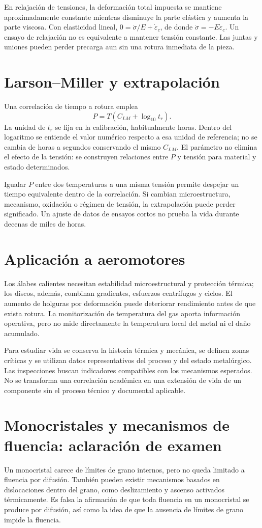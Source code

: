 En relajación de tensiones, la deformación total impuesta se mantiene aproximadamente constante mientras disminuye la parte elástica y aumenta la parte viscosa. Con elasticidad lineal, $0=\dot\sigma/E+\dot\varepsilon_c$, de donde $\dot\sigma=-E\dot\varepsilon_c$. Un ensayo de relajación no es equivalente a mantener tensión constante. Las juntas y uniones pueden perder precarga aun sin una rotura inmediata de la pieza.
\section{Larson--Miller y extrapolación}
Una correlación de tiempo a rotura emplea
\begin{equation}P=T\left(C_{LM}+\log_{10}t_r\right).\label{eq:larson}\end{equation}
La unidad de $t_r$ se fija en la calibración, habitualmente horas. Dentro del logaritmo se entiende el valor numérico respecto a esa unidad de referencia; no se cambia de horas a segundos conservando el mismo $C_{LM}$. El parámetro no elimina el efecto de la tensión: se construyen relaciones entre $P$ y tensión para material y estado determinados.

Igualar $P$ entre dos temperaturas a una misma tensión permite despejar un tiempo equivalente dentro de la correlación. Si cambian microestructura, mecanismo, oxidación o régimen de tensión, la extrapolación puede perder significado. Un ajuste de datos de ensayos cortos no prueba la vida durante decenas de miles de horas.
\section{Aplicación a aeromotores}
Los álabes calientes necesitan estabilidad microestructural y protección térmica; los discos, además, combinan gradientes, esfuerzos centrífugos y ciclos. El aumento de holguras por deformación puede deteriorar rendimiento antes de que exista rotura. La monitorización de temperatura del gas aporta información operativa, pero no mide directamente la temperatura local del metal ni el daño acumulado.

Para estudiar vida se conserva la historia térmica y mecánica, se definen zonas críticas y se utilizan datos representativos del proceso y del estado metalúrgico. Las inspecciones buscan indicadores compatibles con los mecanismos esperados. No se transforma una correlación académica en una extensión de vida de un componente sin el proceso técnico y documental aplicable.
\section{Monocristales y mecanismos de fluencia: aclaración de examen}
Un monocristal carece de límites de grano internos, pero no queda limitado a fluencia por difusión. También pueden existir mecanismos basados en dislocaciones dentro del grano, como deslizamiento y ascenso activados térmicamente. Es falsa la afirmación de que toda fluencia en un monocristal se produce por difusión, así como la idea de que la ausencia de límites de grano impide la fluencia.

